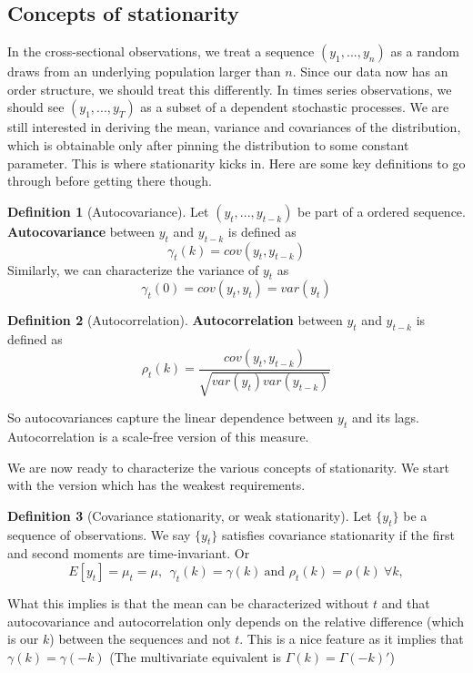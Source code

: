 \documentclass[12pt]{article}
\theoremstyle{definition}
\newtheorem{definition}{Definition}[section]
\theoremstyle{property}
\theoremstyle{assumption}
\theoremstyle{example}
\theoremstyle{comment}
\begin{document}
\subsection{Concepts of stationarity}
In the cross-sectional observations, we treat a sequence $(y_1,...,y_n)$ as a random draws from an underlying population larger than $n$. Since our data now has an order structure, we should treat this differently. In times series observations, we should see $(y_1,...,y_T)$ as a subset of a dependent stochastic processes. We are still interested in deriving the mean, variance and covariances of the distribution, which is obtainable only after pinning the distribution to some constant parameter. This is where stationarity kicks in. Here are some key definitions to go through before getting there though. 
\begin{mdframed}[backgroundcolor=blue!5] 
\begin{definition}[Autocovariance]
Let  $(y_t,...,y_{t-k})$ be part of a ordered sequence. \textbf{Autocovariance} between $y_t$ and $y_{t-k}$ is defined as 
\[
\gamma_t(k)=cov(y_t,y_{t-k})
\]
Similarly, we can characterize the variance of $y_t$ as 
\[
\gamma_t(0)=cov(y_t,y_t)=var(y_t)
\]
\end{definition}

\begin{definition}[Autocorrelation] \textbf{Autocorrelation} between $y_t$ and $y_{t-k}$ is defined as
\[
\rho_t(k) = \frac{cov(y_t,y_{t-k})}{\sqrt{var(y_t)var(y_{t-k})}}
\]
\end{definition}
\end{mdframed}
So autocovariances capture the linear dependence between $y_t$ and its lags. Autocorrelation is a scale-free version of this measure.
\par
We are now ready to characterize the various concepts of stationarity. We start with the version which has the weakest requirements.
\begin{mdframed}[backgroundcolor=blue!5] 
\begin{definition}[Covariance stationarity, or weak stationarity]
Let $\{y_t\}$ be a sequence of observations. We say $\{y_t\}$ satisfies covariance stationarity if the first and second moments are time-invariant. Or
\[
E[y_t]=\mu_t=\mu, \ \ \gamma_t(k)=\gamma(k) \ \text{and }\rho_t(k)=\rho(k) \ \forall k,  
\]
\end{definition}
\end{mdframed}
What this implies is that the mean can be characterized without $t$ and that autocovariance and autocorrelation only depends on the relative difference (which is our $k$) between the sequences and not $t$. This is a nice feature as it implies that $\gamma(k)=\gamma(-k)$ (The multivariate equivalent is $\Gamma(k)=\Gamma(-k)'$)
\end{document}
